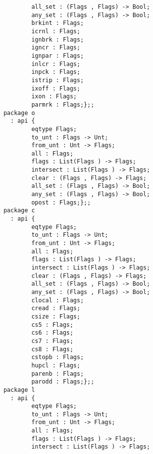 \begin{verbatim}
                            all_set : (Flags , Flags) -> Bool;
                            any_set : (Flags , Flags) -> Bool;
                            brkint : Flags;
                            icrnl : Flags;
                            ignbrk : Flags;
                            igncr : Flags;
                            ignpar : Flags;
                            inlcr : Flags;
                            inpck : Flags;
                            istrip : Flags;
                            ixoff : Flags;
                            ixon : Flags;
                            parmrk : Flags;};;
                    package o
                      : api {
                            eqtype Flags;
                            to_unt : Flags -> Unt;
                            from_unt : Unt -> Flags;
                            all : Flags;
                            flags : List(Flags ) -> Flags;
                            intersect : List(Flags ) -> Flags;
                            clear : (Flags , Flags) -> Flags;
                            all_set : (Flags , Flags) -> Bool;
                            any_set : (Flags , Flags) -> Bool;
                            opost : Flags;};;
                    package c
                      : api {
                            eqtype Flags;
                            to_unt : Flags -> Unt;
                            from_unt : Unt -> Flags;
                            all : Flags;
                            flags : List(Flags ) -> Flags;
                            intersect : List(Flags ) -> Flags;
                            clear : (Flags , Flags) -> Flags;
                            all_set : (Flags , Flags) -> Bool;
                            any_set : (Flags , Flags) -> Bool;
                            clocal : Flags;
                            cread : Flags;
                            csize : Flags;
                            cs5 : Flags;
                            cs6 : Flags;
                            cs7 : Flags;
                            cs8 : Flags;
                            cstopb : Flags;
                            hupcl : Flags;
                            parenb : Flags;
                            parodd : Flags;};;
                    package l
                      : api {
                            eqtype Flags;
                            to_unt : Flags -> Unt;
                            from_unt : Unt -> Flags;
                            all : Flags;
                            flags : List(Flags ) -> Flags;
                            intersect : List(Flags ) -> Flags;

\end{verbatim}
